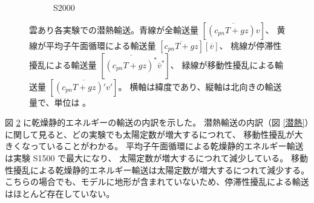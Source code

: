 \documentclass[body]{subfiles}
\begin{document}
\begin{figure}[t]
\begin{subfigure}{.4\textwidth}
		\caption{S2000}\label{乾燥静的エネルギーS2000}
	\end{subfigure}
	\caption[雲あり各実験での乾燥静的エネルギー輸送の内訳]{
		雲あり各実験での潜熱輸送。青線が全輸送量 \([\overline{(c_{pn}T+gz)v}]\)、
		黄線が平均子午面循環による輸送量 \([\overline{c_{pn}T+gz}][\overline{v}]\)、
		桃線が停滞性擾乱による輸送量 \([\overline{(c_{pn}T+gz)^*}\bar v^*]\)、
		緑線が移動性擾乱による輸送量 \([\overline{(c_{pn}T+gz)'v'}]\)。
		横軸は緯度であり、縦軸は北向きの輸送量で、単位は 。
	}\label{乾燥静的エネルギー}
\end{figure}

図 \ref{乾燥静的エネルギー} に乾燥静的エネルギーの輸送の内訳を示した。
潜熱輸送の内訳（図 \ref{潜熱}）に関して見ると、どの実験でも太陽定数が増大するにつれて、
移動性擾乱が大きくなっていることがわかる。
平均子午面循環による乾燥静的エネルギー輸送は実験 S1500 で最大になり、
太陽定数が増大するにつれて減少している。
移動性擾乱による乾燥静的エネルギー輸送は太陽定数が増大するにつれて減少する。
こちらの場合でも、モデルに地形が含まれていないため、停滞性擾乱による輸送はほとんど存在していない。

\afterpage{\clearpage}
\end{document}
